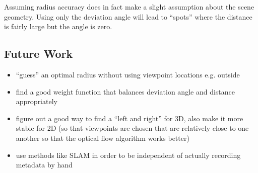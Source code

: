 Assuming radius accuracy does in fact make a slight assumption about the scene geometry. Using only the deviation angle will lead to ``spots'' where the distance is fairly large but the angle is zero. 

\subsection{Future Work}
\begin{itemize}
  \item ``guess'' an optimal radius without using viewpoint locations e.g. outside
  \item find a good weight function that balances deviation angle and distance appropriately
  \item figure out a good way to find a ``left and right'' for 3D, also make it more stable for 2D (so that viewpoints are chosen that are relatively close to one another so that the optical flow algorithm works better)
  \item use methods like SLAM in order to be independent of actually recording metadata by hand
\end{itemize}

